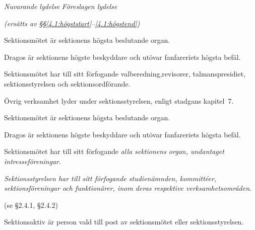 \documentclass{article}
\newenvironment{lydelse}
    {\begin{paracol}{2}%
        \emph{Nuvarande lydelse}%
        \switchcolumn%
        \emph{Föreslagen lydelse}%
    \end{paracol}%
    \begin{enumerate}[label=\thesubsection.\arabic*]%
    \begin{paracol}{2}%
    }{\end{paracol}\end{enumerate}}
\begin{document}
\begin{lydelse}
	\switchcolumn
	\emph{(ersätts av \S\S \ref{4.1:högststart}--\ref{4.1:högstend})}
	
	\switchcolumn*
	\setcounter{subsection}{2}
	\setcounter{enumi}{0}
	\item Sektionsmötet är sektionens högsta beslutande organ.
    \item Dragos är sektionens högste beskyddare och utövar fanfareriets högsta befäl.
    \item Sektionsmötet har till sitt förfogande valberedning,revisorer, talmanspresidiet, sektionsstyrelsen och sektionsordförande.
    \item Övrig verksamhet lyder under sektionsstyrelsen, enligt stadgans kapitel~7.
    
    \switchcolumn
    \setcounter{subsection}{1}
    
    \item Sektionsmötet är sektionens högsta beslutande organ.\label{4.1:högststart}
    
    \item Dragos är sektionens högste beskyddare och utövar fanfareriets högsta befäl.
    
    \item Sektionsmötet har till sitt förfogande \emph{alla sektionens organ, undantaget intresseföreningar}.
    
    \item \emph{Sektionsstyrelsen har till sitt förfogande studienämnden, kommittéer, sektionsföreningar och funktionärer, inom deras respektive verksamhetsområden}.\label{4.1:högstend}
	
	\switchcolumn*
	(se \S 2.4.1, \S 2.4.2)
	
	\switchcolumn
	\setcounter{subsection}{1}
	
	\item Sektionsaktiv är person vald till post av sektionsmötet eller sektionsstyrelsen.\label{4.1:aktiv}
    

\end{lydelse}
\end{document}
